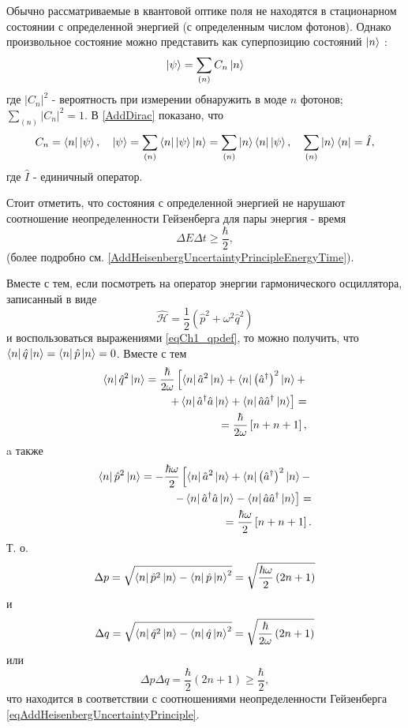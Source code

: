 Обычно рассматриваемые в квантовой оптике поля не находятся в
стационарном состоянии с определенной энергией (с определенным числом
фотонов). Однако произвольное состояние можно представить как
суперпозицию состояний $\ket{n}$ : 
\begin{equation}
\left|\psi\right> = \sum_{(n)} C_n \ket{n}
\end{equation}
где $\left|C_n\right|^2$ - вероятность при измерении обнаружить в моде
$n$ фотонов; $\sum_{(n)} \left|C_n\right|^2 = 1$. 
В \autoref{AddDirac} показано, что
\[
C_n = \bra{ n }\left| \psi \right>, \quad
\left| \psi \right> = \sum_{(n)} \bra{ n }\left| \psi \right>
\ket{ n } =
\sum_{(n)} \ket{ n }\bra{ n }\left| \psi \right>,
\quad
\sum_{(n)} \ket{ n }\bra{ n } = \hat{I},
\]
где $\hat{I}$ - единичный оператор.

\begin{remark}
  Стоит отметить, что состояния с определенной энергией не нарушают 
  соотношение неопределенности Гейзенберга для пары
  энергия - время
  \[
  \Delta E \Delta t \ge \frac{\hbar}{2},
  \]
  (более подробно
  см. \autoref{AddHeisenbergUncertaintyPrincipleEnergyTime}). 

  Вместе с тем, если посмотреть на оператор энергии гармонического
  осциллятора, записанный в виде
  \[
  \hat{\mathcal{H}} =\frac{1}{2} \left(\hat{p}^2 +
  \omega^2\hat{q}^2\right)
  \]
  и воспользоваться выражениями \eqref{eqCh1_qpdef}, то можно получить,
  что $\bra{n}\hat{q}\ket{n} =
  \bra{n}\hat{p}\ket{n} = 0$. Вместе с тем
  \begin{eqnarray}
    \bra{n}\hat{q}^2\ket{n} = \frac{\hbar}{2 \omega}
    \left[
      \bra{n}\hat{a}^2\ket{n} +
      \bra{n}\left(\hat{a}^{\dag}\right)^2\ket{n} +
      \right.
      \nonumber \\
      \left.
      +
      \bra{n}\hat{a}^{\dag}\hat{a}\ket{n} +
      \bra{n}\hat{a}\hat{a}^{\dag}\ket{n}
      \right] =
    \nonumber \\
    = \frac{\hbar}{2 \omega}
    \left[n + n + 1\right],
    \nonumber
  \end{eqnarray}
  a также
  \begin{eqnarray}
    \bra{n}\hat{p}^2\ket{n} = - \frac{\hbar \omega}{2}
    \left[
      \bra{n}\hat{a}^2\ket{n} +
      \bra{n}\left(\hat{a}^{\dag}\right)^2\ket{n} - \right.
      \nonumber \\
      \left.
      -
      \bra{n}\hat{a}^{\dag}\hat{a}\ket{n} -
      \bra{n}\hat{a}\hat{a}^{\dag}\ket{n}
      \right] =
    \nonumber \\
    = \frac{\hbar \omega}{2}
    \left[n + n + 1\right].
    \nonumber
  \end{eqnarray}
  Т. о.
  \[
  \Delta p = \sqrt{\bra{n}\hat{p}^2\ket{n} -
    \bra{n}\hat{p}\ket{n}^2} =
  \sqrt{\frac{\hbar \omega}{2}\left(2n + 1\right)}
  \]
  и
  \[
  \Delta q = \sqrt{\bra{n}\hat{q}^2\ket{n} -
    \bra{n}\hat{q}\ket{n}^2} =
  \sqrt{\frac{\hbar}{2\omega}\left(2n + 1\right)}
  \]
  или
  \[
  \Delta p \Delta q = \frac{\hbar}{2}\left(2n + 1\right) \ge \frac{\hbar}{2},
  \]
  что находится в соответствии с соотношениями неопределенности
  Гейзенберга \eqref{eqAddHeisenbergUncertaintyPrinciple}.


\end{remark}
